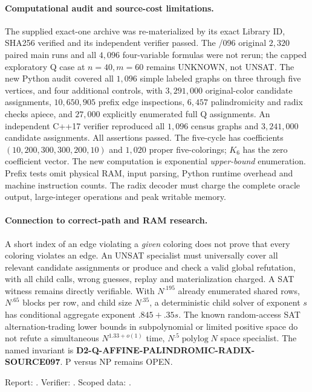 \documentclass[11pt]{article}
\begin{document}
\paragraph{Computational audit and source-cost limitations.}
The supplied exact-one archive was re-materialized by its
exact Library ID, SHA256 verified and its independent
verifier passed. The /096 original $2{,}320$ paired main
runs and all $4{,}096$ four-variable formulas were not rerun;
the capped exploratory Q case at $n=40,m=60$ remains
\textsf{UNKNOWN}, not UNSAT.
The new Python audit covered all $1{,}096$ simple labeled
graphs on three through five vertices, and four additional
controls, with $3{,}291{,}000$ original-color candidate
assignments, $10{,}650{,}905$ prefix edge inspections,
$6{,}457$ palindromicity and radix checks apiece, and
$27{,}000$ explicitly enumerated full Q assignments.
An independent C++17 verifier reproduced all $1{,}096$
census graphs and $3{,}241{,}000$ candidate assignments.
All assertions passed. The five-cycle has coefficients
$(10,200,300,300,200,10)$ and $1{,}020$ proper
five-colorings; $K_6$ has the zero coefficient vector.
The new computation is exponential \emph{upper-bound}
enumeration. Prefix tests omit physical RAM, input parsing,
Python runtime overhead and machine instruction counts.
The radix decoder must charge the complete oracle output,
large-integer operations and peak writable memory.

\paragraph{Connection to correct-path and RAM research.}
A short index of an edge violating a \emph{given} coloring
does not prove that every coloring violates an edge.
An UNSAT specialist must universally cover all relevant
candidate assignments or produce and check a valid global
refutation, with all child calls, wrong guesses, replay and
materialization charged. A SAT witness remains directly
verifiable. With $N^{.195}$ already enumerated shared rows,
$N^{.65}$ blocks per row, and child size $N^{.35}$,
a deterministic child solver of exponent $s$ has conditional
aggregate exponent $.845+.35s$. The known random-access
SAT alternation-trading lower bounds in subpolynomial or
limited positive space do not refute a simultaneous
$N^{1.33+o(1)}$ time, $N^{.5}\operatorname{polylog}N$
space specialist. The named invariant is
\textbf{D2-Q-AFFINE-PALINDROMIC-RADIX-SOURCE097}.
P versus NP remains OPEN.

Report: .
Verifier: .
Scoped data: .
\end{document}
